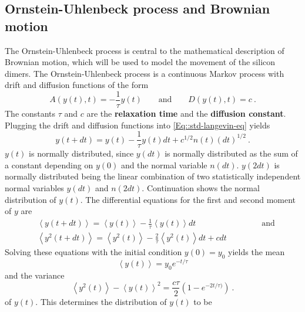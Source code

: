  		\subsection{Ornstein-Uhlenbeck process and Brownian motion} \label{Section::Brownian-Motion}
 		The Ornstein-Uhlenbeck process is central to the mathematical description of Brownian motion, which will be used to model the movement of the silicon dimers. The Ornstein-Uhlenbeck process is a continuous Markov process with drift and diffusion functions of the form
 		\begin{equation}
 			A(y(t), t) =	- \frac{1}{\tau} y(t) \qquad \text{and} \qquad D(y(t), t) =	c~.
 		\end{equation}
 		The constants $\tau$ and $c$ are the \textbf{relaxation time} and the \textbf{diffusion constant}. Plugging the drift and diffusion functions into \autoref{Eq::std-langevin-eq} yields
 		\begin{equation}\label{Eq::OU-Langevin}
 			 			y(t + dt) =	y(t) - \frac{1}{\tau} y(t) dt + c^{1/2} n(t) (dt)^{1/2}~.
 		\end{equation}
 		$y(t)$ is normally distributed, since $y(dt)$ is normally distributed as the sum of a constant depending on $y(0)$ and the normal variable $n(dt)$. $y(2dt)$ is normally distributed being the linear combination of two statistically independent normal variables $y(dt)$ and $n(2dt)$. Continuation shows the normal distribution of $y(t)$.
 		The differential equations for the first and second moment of $y$ are
 		\begin{align}
 			&\left \langle y(t + dt) \right \rangle =	\left \langle y(t) \right \rangle - \frac{1}{\tau} \left \langle y(t) \right \rangle dt \qquad \qquad \qquad \qquad  \text{and} \\
 			&\left \langle y^2(t + dt) \right \rangle =	\left \langle y^2(t) \right \rangle - \frac{2}{\tau} \left \langle y^2(t) \right \rangle dt  + c dt
 		\end{align}
 		Solving these equations with the initial condition $y(0) =	y_0$ yields the mean
 		\begin{equation}
 			\left \langle y(t) \right \rangle =	 y_0 e^{-t/\tau}
 		\end{equation}
 		and the variance 
 		\begin{equation}
 			\left \langle y^2(t) \right \rangle - \left \langle y(t) \right \rangle^2 =	\frac{c\tau}{2} \left(1 - e^{-2t /	\tau)}\right)~.
 		\end{equation}
 		of $y(t)$. This determines the distribution of $y(t)$ to be
